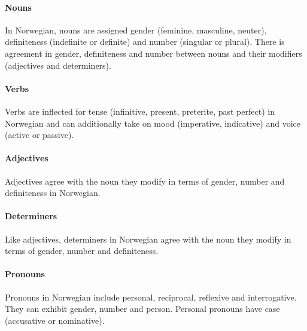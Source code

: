 \documentclass[11pt,a4paper]{article}
\begin{document}
\paragraph{Nouns}
In Norwegian, nouns are assigned gender (feminine, masculine, neuter),
definiteness (indefinite or definite) and number (singular or plural). There
is agreement in gender, definiteness and number between nouns and their
modifiers (adjectives and determiners).

\paragraph{Verbs}
Verbs are inflected for tense (infinitive, present, preterite, past perfect)
in Norwegian and can additionally take on mood (imperative, indicative) and
voice (active or passive).

\paragraph{Adjectives}
Adjectives agree with the noun they modify in terms of gender, number and
definiteness in Norwegian.

\paragraph{Determiners}
Like adjectives, determiners in Norwegian agree with the noun they modify in
terms of gender, number and definiteness.

\paragraph{Pronouns}
Pronouns in Norwegian include personal, reciprocal, reflexive and
interrogative. They can exhibit gender, number and person. Personal pronouns
have case (accusative or nominative).

\end{document}
